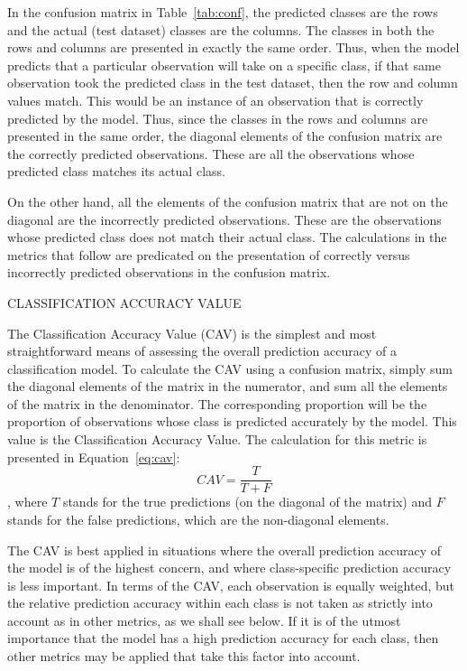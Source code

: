 \documentclass[12pt]{article}
\begin{document}
In the confusion matrix in Table~\ref{tab:conf}, the predicted classes are the 
rows and the actual (test dataset) classes are the columns.  The classes in 
both the rows and columns are presented in exactly the same order.  Thus, when 
the model predicts that a particular observation will take on a specific class, 
if that same observation took the predicted class in the test dataset, then the 
row and column values match.  This would be an instance of an observation that 
is correctly predicted by the model.  Thus, since the classes in the rows and 
columns are presented in the same order, the diagonal elements of the confusion 
matrix are the correctly predicted observations.  These are all the observations 
whose predicted class matches its actual class.  

On the other hand, all the elements of the confusion matrix that are not on the 
diagonal are the incorrectly predicted observations.  These are the observations 
whose predicted class does not match their actual class.  The calculations in 
the metrics that follow are predicated on the presentation of correctly versus 
incorrectly predicted observations in the confusion matrix.  

CLASSIFICATION ACCURACY VALUE

The Classification Accuracy Value (CAV) is the simplest and most straightforward 
means of assessing the overall prediction accuracy of a classification model.  To 
calculate the CAV using a confusion matrix, simply sum the diagonal elements of 
the matrix in the numerator, and sum all the elements of the matrix in the 
denominator.  The corresponding proportion will be the proportion of observations 
whose class is predicted accurately by the model.  This value is the Classification 
Accuracy Value.  The calculation for this metric is presented in 
Equation~\eqref{eq:cav}:
\begin{equation}
    \label{eq:cav}
    CAV = \frac {T} {T + F}
\end{equation}
, where $T$ stands for the true predictions (on the diagonal of the matrix) and $F$ 
stands for the false predictions, which are the non-diagonal elements.  

The CAV is best applied in situations where the overall prediction accuracy of the 
model is of the highest concern, and where class-specific prediction accuracy is less 
important.  In terms of the CAV, each observation is equally weighted, but the 
relative prediction accuracy within each class is not taken as strictly into account 
as in other metrics, as we shall see below.  If it is of the utmost importance that 
the model has a high prediction accuracy for each class, then other metrics may be 
applied that take this factor into account.
\end{document}
